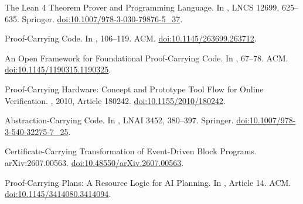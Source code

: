 \documentclass[11pt]{article}
\theoremstyle{definition}
\begin{document}
\begin{OpusReferences}

\newblock The Lean 4 Theorem Prover and Programming Language.
\newblock In , LNCS 12699, 625--635. Springer.
\newblock \href{https://doi.org/10.1007/978-3-030-79876-5_37}{doi:10.1007/978-3-030-79876-5\_37}.

\newblock Proof-Carrying Code.
\newblock In , 106--119. ACM.
\newblock \href{https://doi.org/10.1145/263699.263712}{doi:10.1145/263699.263712}.

\newblock An Open Framework for Foundational Proof-Carrying Code.
\newblock In , 67--78. ACM.
\newblock \href{https://doi.org/10.1145/1190315.1190325}{doi:10.1145/1190315.1190325}.

\newblock Proof-Carrying Hardware: Concept and Prototype Tool Flow for Online Verification.
\newblock {}, 2010, Article 180242.
\newblock \href{https://doi.org/10.1155/2010/180242}{doi:10.1155/2010/180242}.

\newblock Abstraction-Carrying Code.
\newblock In , LNAI 3452, 380--397. Springer.
\newblock \href{https://doi.org/10.1007/978-3-540-32275-7_25}{doi:10.1007/978-3-540-32275-7\_25}.

\newblock Certificate-Carrying Transformation of Event-Driven Block Programs.
\newblock arXiv:2607.00563.
\newblock \href{https://doi.org/10.48550/arXiv.2607.00563}{doi:10.48550/arXiv.2607.00563}.

\newblock Proof-Carrying Plans: A Resource Logic for AI Planning.
\newblock In , Article 14. ACM.
\newblock \href{https://doi.org/10.1145/3414080.3414094}{doi:10.1145/3414080.3414094}.


\end{OpusReferences}
\end{document}
